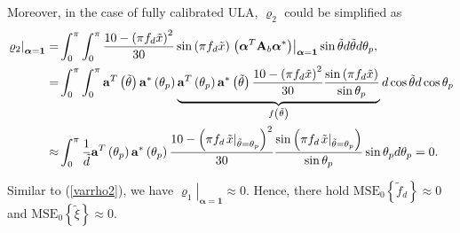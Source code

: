 \documentclass[12pt, draftclsnofoot, onecolumn]{IEEEtran}
\begin{document}
Moreover, in the case of fully calibrated ULA, ${\varrho}_{2}$ could be simplified as
\begin{align}\label{varrho2}
{{\left. {{\varrho }_{2}} \right|}_{\boldsymbol{\alpha }=\mathbf{1}}} = & \int_{0}^{ \rm{\pi} }\int_{0}^{ \rm{\pi} } \frac{10 - {{\left( { \rm{\pi} } {{f}_{d}}\tilde{x} \right)}^{2}}}{30} \sin \left( { \rm{\pi} }{{f}_{d}}\tilde{x} \right) {{\left. \left( {{\boldsymbol{\alpha }}^{T}}{{\mathbf{A}}_{b}}{{\boldsymbol{\alpha }}^{*}} \right) \right|}_{\boldsymbol{\alpha }=\mathbf{1}}} \sin \tilde{\theta }d\tilde{\theta }d{{\theta }_{p}}, \nonumber \\
= & \int_{0}^{ \rm{\pi} }\int_{0}^{ \rm{\pi} } {{\mathbf{a}}^{T}}\left( {\tilde{\theta }} \right) {{\mathbf{a}}^{*}}\left( {{\theta }_{p}} \right)  \underbrace{{{\mathbf{a}}^{T}}\left( {{\theta }_{p}} \right) {{\mathbf{a}}^{*}}\left( {\tilde{\theta }} \right) \frac{10 - {{\left( { \rm{\pi} } {{f}_{d}}\tilde{x} \right)}^{2}}}{30} \frac{ \sin \left( { \rm{\pi} }{{f}_{d}}\tilde{x} \right) }{\sin {{\theta }_{p}}}}_{f\left( {\tilde{\theta }} \right)}d\cos \tilde{\theta }d\cos {{\theta }_{p}} \nonumber \\
\approx & \int_{0}^{ \rm{\pi} }{\frac{1}{\tilde{d}} {{\mathbf{a}}^{T}}\left( {{\theta }_{p}} \right) {{\mathbf{a}}^{*}}\left( {{\theta }_{p}} \right) \frac{10 - {{\left( { \rm{\pi} } {{f}_{d}} { {{\left. {\tilde{x}} \right|}_{\tilde{\theta} = \theta_{p} }} } \right)}^{2}}}{30} \frac{ \sin \left( { \rm{\pi} }{{f}_{d}} { {{\left. {\tilde{x}} \right|}_{\tilde{\theta} = \theta_{p} }} } \right) }{\sin {{\theta }_{p}}} \sin {{\theta }_{p}}d{{\theta }_{p}}} = 0.
\end{align}

Similar to (\ref{varrho2}), we have ${{\left. {{\varrho }_{1}} \right|}_{\boldsymbol{\alpha }=\mathbf{1}}} \approx 0$.
Hence, there hold ${{\text{MSE}}_{0}}\left\{ {{{\tilde{f}}_{d}}} \right\} \approx 0$ and ${{\text{MSE}}_{0}}\left\{ {{{\tilde{\xi}}}} \right\} \approx 0$.

\vspace{-0.6em}
\end{document}
